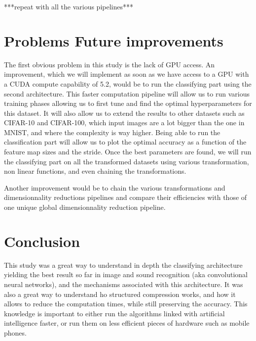 \documentclass[11pt,a4paper]{article}
\begin{document}
	
	***repeat with all the various pipelines***
	
	
	\section{Problems Future improvements}
	The first obvious problem in this study is the lack of GPU access.
	An improvement, which we will implement as soon as we have access to a GPU with a CUDA compute capability of 5.2, would be to run the classifying part using the second architecture.
	This faster computation pipeline will allow us to run various training phases allowing us to first tune and find the optimal hyperparameters for this dataset.
	It will also allow us to extend the results to other datasets such as CIFAR-10 and CIFAR-100, which input images are a lot bigger than the one in MNIST, and where the complexity is way higher.
	Being able to run the classification part will allow us to plot the optimal accuracy as a function of the feature map sizes and the stride.
	Once the best parameters are found, we will run the classifying part on all the transformed datasets using various transformation, non linear functions, and even chaining the transformations.
	
	Another improvement would be to chain the various transformations and dimensionnality reductions pipelines and compare their efficiencies with those of one unique global dimensionnality reduction pipeline.
	
	
	\section{Conclusion}
	This study was a great way to understand in depth the classifying architecture yielding the best result so far in image and sound recognition (aka convolutional neural networks), and the mechanisms associated with this architecture.
	It was also a great way to understand ho structured compression works, and how it allows to reduce the computation times, while still preserving the accuracy. This knowledge is important to either run the algorithms linked with artificial intelligence faster, or run them on less efficient pieces of hardware such as mobile phones.
\end{document}
